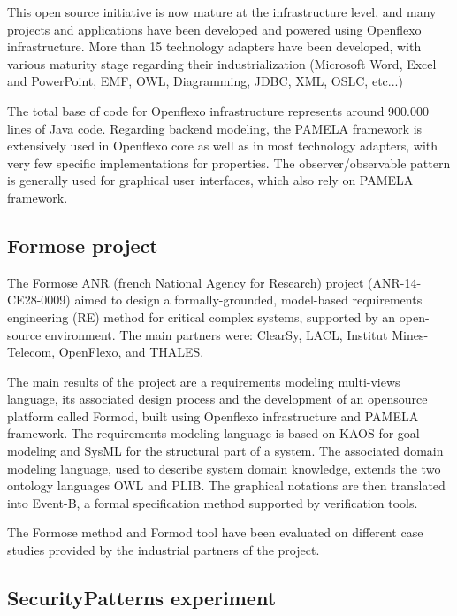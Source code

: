 This open source initiative is now mature at the infrastructure level, and many projects and applications have been developed and powered using Openflexo infrastructure. More than 15 technology adapters have been developed, with various maturity stage regarding their industrialization (Microsoft Word, Excel and PowerPoint, EMF, OWL, Diagramming, JDBC, XML, OSLC, etc...)

The total base of code for Openflexo infrastructure represents around 900.000 lines of Java code. Regarding backend modeling, the PAMELA framework is extensively used in Openflexo core as well as in most technology adapters, with very few specific implementations for properties. The observer/observable pattern is generally used for graphical user interfaces, which also rely on PAMELA framework. 


\subsection{Formose project}

The Formose ANR (french National Agency for Research) project (ANR-14-CE28-0009)\cite{FormoseWebSite} aimed to design a formally-grounded, model-based requirements engineering (RE) method for critical complex systems, supported by an open-source environment. The main partners were: ClearSy, LACL, Institut Mines-Telecom, OpenFlexo, and THALES. 

The main results of the project are a requirements modeling multi-views language, its associated design process and the development of an opensource platform called Formod\cite{FormodWebSite}, built using Openflexo infrastructure and PAMELA framework.  The requirements modeling language is based on KAOS for goal modeling and SysML for the structural part of a system. The associated domain modeling language, used to describe system domain knowledge, extends the two ontology languages OWL and PLIB. The graphical notations are then translated into Event-B, a formal specification method supported by verification tools. 


The Formose method and Formod tool have been evaluated on different case studies provided by the industrial partners of the project.



\subsection{SecurityPatterns experiment}

